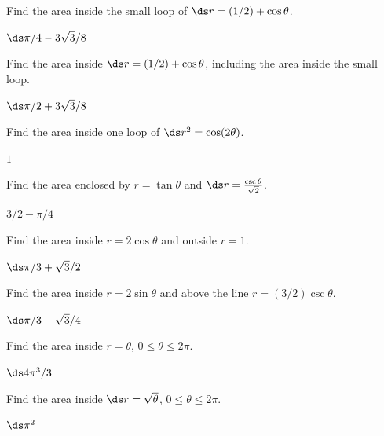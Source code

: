\begin{enumialphparenastyle}
\begin{ex}
 Find the area inside the small loop of $\ds r=(1/2)+\cos\theta$.
\begin{sol}
 $\ds \pi/4-3\sqrt3/8$
\end{sol}
\end{ex}

\begin{ex}
 Find the area inside $\ds r=(1/2)+\cos\theta$, including the
area inside the small loop.
\begin{sol}
 $\ds \pi/2+3\sqrt3/8$
\end{sol}
\end{ex}

\begin{ex}
 Find the area inside one loop of $\ds r^2=\cos(2\theta)$.
\begin{sol}
 $1$
\end{sol}
\end{ex}

\begin{ex}
 Find the area enclosed by $r=\tan\theta$ and 
$\ds r={\csc\theta\over\sqrt2}$.
\begin{sol}
 $3/2-\pi/4$
\end{sol}
\end{ex}

\begin{ex}
 Find the area inside $r=2\cos\theta$ and outside
$r=1$.
\begin{sol}
 $\ds \pi/3+\sqrt3/2$
\end{sol}
\end{ex}

\begin{ex}
 Find the area inside $r=2\sin\theta$ and above
the line $r=(3/2)\csc\theta$.
\begin{sol}
 $\ds \pi/3-\sqrt3/4$
\end{sol}
\end{ex}

\begin{ex}
 Find the area inside $r=\theta$, $0\le\theta\le2\pi$.
\begin{sol}
 $\ds 4\pi^3/3$
\end{sol}
\end{ex}

\begin{ex}
 Find the area inside $\ds r=\sqrt{\theta}$, $0\le\theta\le2\pi$.
\begin{sol}
 $\ds \pi^2$
\end{sol}
\end{ex}


\end{enumialphparenastyle}
